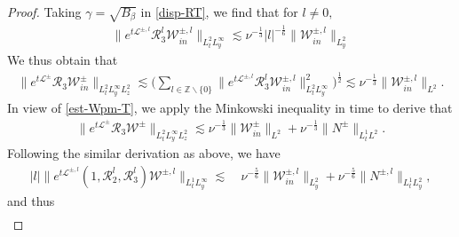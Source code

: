 \documentclass[11pt,reqno]{article}
\numberwithin{equation}{section}
\newcommand\Z{{\mathbb Z}}
\newcommand\W{{\mathcal W}}
\let\f=\frac
\def \cR {\mathcal{R}}
\begin{document}
\begin{proof}%
    
     Taking $ \gamma=\sqrt{B_{\beta}}$ in \eqref{disp-RT}, we find that for $l\neq 0,$
    \begin{align*}
        \| e^{t\mathcal{L}^{\pm,l}  } \cR_3^l\W^{\pm,l}_{in} \|_{L^2_t L^{\infty}_y}
        \lesssim \nu^{-\f13}|l|^{-\f16}\|\W^{\pm,l}_{in}\|_{L^2_y}%
    \end{align*}
 We thus obtain that
    \begin{align*}
        \| e^{t \mathcal{L}^{\pm}} \mathcal{R}_3\W^{\pm}_{in} \|_{L^2_t L^{\infty}_yL^2_z}
        \lesssim  \Big(\sum_{l\in  \Z \backslash \{0\}}
        \| e^{t \mathcal{L}^{\pm,l}} \mathcal{R}_3^l\W_{in}^{\pm,l} \|_{L^2_t L^{\infty}_y}^2\Big)^{\f12}\lesssim 
        \nu^{-\f13}\|\W^{\pm,l}_{in}\|_{L^2}.
    \end{align*}
  In view of \eqref{est-Wpm-T}, we apply the Minkowski inequality in time to derive that
    \begin{align}\label{est-R3-RT1}
        \| e^{t \mathcal{L}^{\pm}} \mathcal{R}_3\W^{\pm} \|_{L^2_t L^{\infty}_yL^2_z}
        \lesssim
        \nu^{-\f13}\|\W^{\pm}_{in}\|_{L^2}+\nu^{-\f13}\|N^{\pm}\|_{L^1_tL^2}.
    \end{align}
    Following the similar derivation as above, we have
    \begin{align*}
       |l| \| e^{t \mathcal{L}^{\pm,l}} (1,\cR_2^l,\cR_3^l)\W^{\pm,l} \|_{L^1_t L^{\infty}_y}
        \lesssim &~
        \nu^{-\f56}\|\W^{\pm,l}_{in}\|_{L^2_{y}}+\nu^{-\f56}\|N^{\pm,l}\|_{L^1_tL^2_{y}},
    \end{align*}
 and thus
    \begin{align}\label{est-R3-RT2}

\end{align}
\end{proof}
\end{document}
